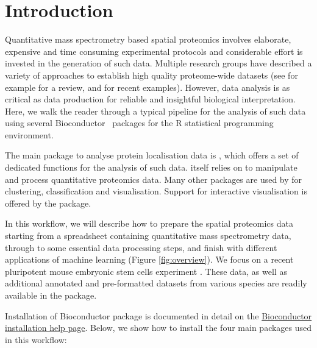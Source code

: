 


\section*{Introduction}

Quantitative mass spectrometry based spatial proteomics involves
elaborate, expensive and time consuming experimental protocols and
considerable effort is invested in the generation of such data.
Multiple research groups have described a variety of approaches to
establish high quality proteome-wide datasets (see for example
\cite{Gatto:2010} for a review, and
\cite{hyper,Itzhak:2016,Jean_Beltran:2016} for recent
examples). However, data analysis is as critical as data production
for reliable and insightful biological interpretation. Here, we walk
the reader through a typical pipeline for the analysis of such data
using several Bioconductor~\cite{Huber:2015} packages for the R
statistical programming environment.

The main package to analyse protein localisation data is
, which offers a set of dedicated functions for the
analysis of such data.  itself relies on
 to manipulate and process quantitative proteomics
data. Many other packages are used by  for clustering,
classification and visualisation. Support for interactive
visualisation is offered by the  package.

In this workflow, we will describe how to prepare the spatial
proteomics data starting from a spreadsheet containing quantitative
mass spectrometry data, through to some essential data processing
steps, and finish with different applications of machine learning
(Figure \ref{fig:overview}). We focus on a recent pluripotent mouse
embryonic stem cells experiment \cite{hyper}. These data, as well as
additional annotated and pre-formatted datasets from various species
are readily available in the  package.

Installation of Bioconductor package is documented in detail on the
\href{http://bioconductor.org/install/#install-bioconductor-packages}{Bioconductor
  installation help page}. Below, we show how to install the four main
packages used in this workflow:

\begin{knitrout}
\color{fgcolor}\begin{kframe}
\begin{alltt}
\hlstd{(}\hlstd{)}
\hlstd{(}\hlstd{(}\hlstd{,} \hlstd{,} \hlstd{,} \hlstd{))}
\end{alltt}
\end{kframe}
\end{knitrout}


